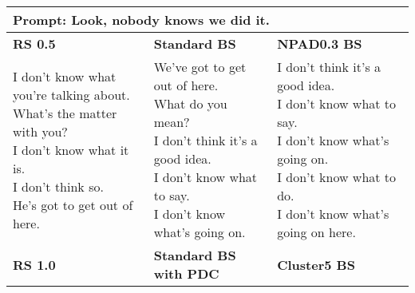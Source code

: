 \documentclass[thesis.tex]{subfiles}
\begin{document}
\begin{table*}[t]
    \centering
    \scriptsize
    \begin{tabular}{|l|l|l|}
    \hline
    \multicolumn{3}{|l|}{\rule{0pt}{0.35cm} \normalsize \textbf{Prompt:} Look, nobody knows we did it.}  \\ 
    \hline \hline
    \footnotesize \textbf{RS 0.5} & \footnotesize \textbf{Standard BS} & \footnotesize \textbf{NPAD0.3 BS} \\
    \hline
\makecell[l]{
I don't know what you're talking about. \\
What's the matter with you? \\
I don't know what it is. \\
I don't think so. \\
He's got to get out of here. \\
}&
\makecell[l]{
We've got to get out of here. \\
What do you mean? \\
I don't think it's a good idea. \\
I don't know what to say. \\
I don't know what's going on. \\
}&
\makecell[l]{
I don't think it's a good idea. \\
I don't know what to say. \\
I don't know what's going on. \\
I don't know what to do. \\
\tiny I don't know what's going on here. \\
} \\
    \hline
    \hline
    \footnotesize \textbf{RS 1.0} & \footnotesize \textbf{Standard BS with PDC} &  \footnotesize \textbf{Cluster5 BS} \\
    \hline
    

\end{tabular}
\end{table*}
\end{document}
